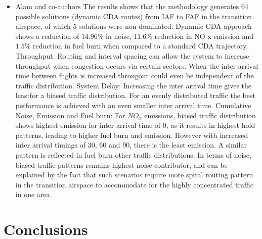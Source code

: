 \documentclass{aer1315-pretty}
\begin{document}
\begin{itemize}
\item Alam and co-authors \cite{Alam:2010} 
 The results shows that the methodology generates 64 possible solutions (dynamic CDA routes) from IAF to FAF in the transition airspace, of which 5 solutions were non-dominated. Dynamic CDA approach shows a reduction of $14.96\%$ in noise, $11.6\%$ reduction in NO x emission and $1.5\%$ reduction in fuel burn when compared to a standard CDA trajectory.
Throughput: Routing and interval spacing can allow the system to increase throughput when congestion occurs via certain sectors. When the inter arrival time between flights is increased througout could even be independent of the traffic distribution. 
System Delay: Increasing the inter arrival time gives the leastfor a biased traffic distribution. For an evenly distributed traffic the best performance is achieved with
an even smaller inter arrival time.
Cumulative Noise, Emission and Fuel burn: For $NO_x$ emissions, biased traffic distribution shows highest emission for inter-arrival time of 0, as it results in highest hold patterns, leading to higher fuel burn and emission. However with increased inter arrival timings of 30, 60 and 90, there is the least emission. A similar pattern is reflected in fuel burn other traffic distributions. In terms of noise, biased traffic patterns remains highest noise contributor, and can be explained by the fact that such scenarios require more spiral routing pattern in the transition airspace to accommodate for the highly concentrated traffic in one area.


\end{itemize}


\section{Conclusions}  \label{sec:conclusion}
\end{document}
